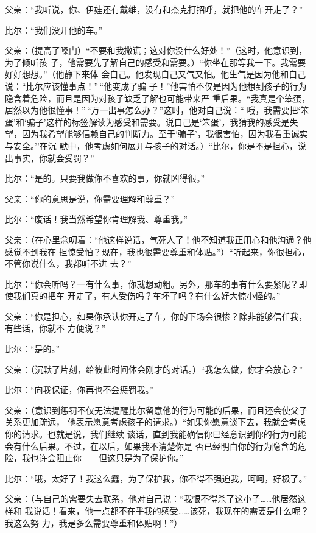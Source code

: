 \documentclass{ctexart}
\renewenvironment{quotation}{\setlength{\parskip}{0.5em}\setstretch{1.5}\kaishu\zihao{-5}\setlength{\parindent}{1em}}{\vspace{1em}}
\begin{document}
\begin{quotation}
	父亲：``我听说，你、伊娃还有戴维，没有和杰克打招呼，就把他的车开走了？''

	比尔：``我们没开他的车。''

	父亲：（提高了嗓门）``不要和我撒谎；这对你没什么好处！''（这时，他意识到，为了倾听孩
	子，他需要先了解自己的感受和需要。）``你坐在那等我一下。我需要好好想想。''（他静下来体
	会自己。他发现自己又气又怕。他生气是因为他和自己说：``比尔应该懂事点！''\,``他变成了骗
	子！''他害怕不仅是因为他想到孩子的行为隐含着危险，而且是因为对孩子缺乏了解也可能带来严
	重后果。``我真是个笨蛋，居然以为他很懂事！''\,``万一出事怎么办？''这时，他对自己说：``
	哦，我需要把`笨蛋'和`骗子'这样的标签解读为感受和需要。说自己是`笨蛋'，我猜我的感受是失
	望，因为我希望能够信赖自己的判断力。至于`骗子'，我很害怕，因为我看重诚实与安全。''在沉
	默中，他考虑如何展开与孩子的对话。）``比尔，你是不是担心，说出事实，你就会受罚？''

	比尔：``是的。只要我做你不喜欢的事，你就凶得很。''

	父亲：``你的意思是说，你需要理解和尊重？''

	比尔：``废话！我当然希望你肯理解我、尊重我。''

	父亲：（在心里念叨着：``他这样说话，气死人了！他不知道我正用心和他沟通？他感觉不到我在
	担惊受怕？现在，我也很需要尊重和体贴。''）``听起来，你很担心，不管你说什么，我都听不进
	去？''

	比尔：``你会听吗？一有什么事，你就想动粗。另外，那车的事有什么要紧呢？即使我们真的把车
	开走了，有人受伤吗？车坏了吗？有什么好大惊小怪的。''

	父亲：``你是担心，如果你承认你开走了车，你的下场会很惨？除非能够信任我，有些话，你就不
	方便说？''

	比尔：``是的。''

	父亲：（沉默了片刻，给彼此时间体会刚才的对话。）``我怎么做，你才会放心？''

	比尔：``向我保证，你再也不会惩罚我。''

	父亲：（意识到惩罚不仅无法提醒比尔留意他的行为可能的后果，而且还会使父子关系更加疏远，
	他表示愿意考虑孩子的请求。）``如果你愿意谈下去，我就会考虑你的请求。也就是说，我们继续
	谈话，直到我能确信你已经意识到你的行为可能会有什么后果。不过，在以后，如果我不清楚你是
	否已经明白你的行为隐含的危险，我也许会阻止你------但这只是为了保护你。''

	比尔：``哦，太好了！我这么蠢，为了保护我，你不得不强迫我，呵呵，好极了。''

	父亲：（与自己的需要失去联系，他对自己说：``我恨不得杀了这小子\ldots\ldots 他居然这样和
	我说话！看来，他一点都不在乎我的感受\ldots\ldots 该死，我现在的需要是什么呢？我这么努
	力，我是多么需要尊重和体贴啊！''）


\end{quotation}
\end{document}
